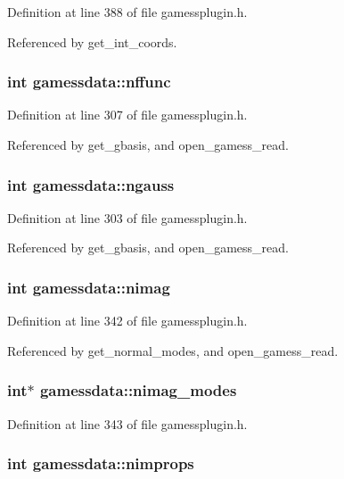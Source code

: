 Definition at line 388 of file gamessplugin.h.

Referenced by get\_\-int\_\-coords.
\subsubsection{\setlength{\rightskip}{0pt plus 5cm}int gamessdata::nffunc}\label{structgamessdata_m9}




Definition at line 307 of file gamessplugin.h.

Referenced by get\_\-gbasis, and open\_\-gamess\_\-read.
\subsubsection{\setlength{\rightskip}{0pt plus 5cm}int gamessdata::ngauss}\label{structgamessdata_m6}




Definition at line 303 of file gamessplugin.h.

Referenced by get\_\-gbasis, and open\_\-gamess\_\-read.
\subsubsection{\setlength{\rightskip}{0pt plus 5cm}int gamessdata::nimag}\label{structgamessdata_m24}




Definition at line 342 of file gamessplugin.h.

Referenced by get\_\-normal\_\-modes, and open\_\-gamess\_\-read.
\subsubsection{\setlength{\rightskip}{0pt plus 5cm}int$\ast$ gamessdata::nimag\_\-modes}\label{structgamessdata_m25}




Definition at line 343 of file gamessplugin.h.
\subsubsection{\setlength{\rightskip}{0pt plus 5cm}int gamessdata::nimprops}\label{structgamessdata_m43}




